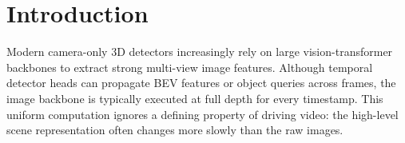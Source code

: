 \documentclass[10pt,twocolumn,letterpaper]{article}
\newcommand{\method}{\textsc{EvoMem3D}}
\begin{document}


\section{Introduction}

Modern camera-only 3D detectors increasingly rely on large
vision-transformer backbones to extract strong multi-view image
features. Although temporal detector heads can propagate BEV features
or object queries across frames, the image backbone is typically
executed at full depth for every timestamp. This uniform computation
ignores a defining property of driving video: the high-level scene
representation often changes more slowly than the raw images.
\end{document}
